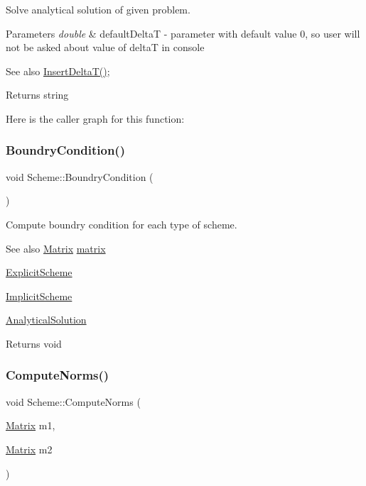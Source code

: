 Solve analytical solution of given problem. 
\begin{DoxyParams}{Parameters}
{\em double} & default\+DeltaT -\/ parameter with default value 0, so user will not be asked about value of deltaT in console \\
\hline
\end{DoxyParams}
\begin{DoxySeeAlso}{See also}
\mbox{\hyperlink{class_scheme_ac5803e4951dc125b274f543d5037c21d}{Insert\+Delta\+T()}}; 
\end{DoxySeeAlso}
\begin{DoxyReturn}{Returns}
string 
\end{DoxyReturn}
Here is the caller graph for this function\+:
\mbox{\label{class_scheme_a36885039937c25f13c8daea654e37b97}} 
\subsubsection{\texorpdfstring{Boundry\+Condition()}{BoundryCondition()}}
{\footnotesize\ttfamily void Scheme\+::\+Boundry\+Condition (\begin{DoxyParamCaption}{ }\end{DoxyParamCaption})\hspace{0.3cm}{\ttfamily [protected]}}

Compute boundry condition for each type of scheme. \begin{DoxySeeAlso}{See also}
\mbox{\hyperlink{class_matrix}{Matrix}} \mbox{\hyperlink{class_scheme_a0e1fb8cb7e062d3f49715445a884f0e8}{matrix}} 

\mbox{\hyperlink{class_explicit_scheme}{Explicit\+Scheme}} 

\mbox{\hyperlink{class_implicit_scheme}{Implicit\+Scheme}} 

\mbox{\hyperlink{class_scheme_a7d3e9f8133a955517471eb7a6fea355f}{Analytical\+Solution}} 
\end{DoxySeeAlso}
\begin{DoxyReturn}{Returns}
void 
\end{DoxyReturn}
\mbox{\label{class_scheme_ae098876d0287ac2bf5220608db2a8468}} 
\subsubsection{\texorpdfstring{Compute\+Norms()}{ComputeNorms()}}
{\footnotesize\ttfamily void Scheme\+::\+Compute\+Norms (\begin{DoxyParamCaption}\item[{\mbox{\hyperlink{class_matrix}{Matrix}}}]{m1,  }\item[{\mbox{\hyperlink{class_matrix}{Matrix}}}]{m2 }\end{DoxyParamCaption})}

